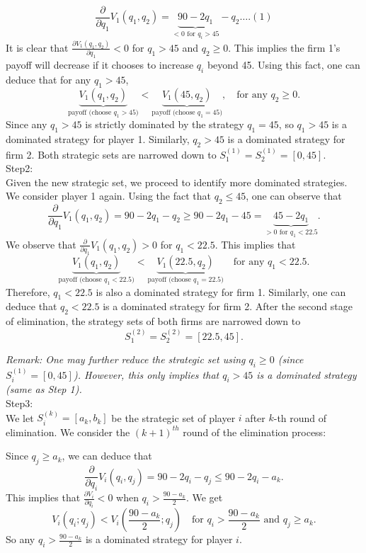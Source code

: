 \documentclass[twoside]{article}
\theoremstyle{definitionstyle}
\begin{document}
\[
\frac{\partial}{\partial q_1} V_1(q_1, q_2) = \underbrace{90 - 2q_1}_{\text{$<0$ for $q_i>45$}}-q_2\dots.(1)
\]
It is clear that $\frac{\partial V_1(q_1,q_2)}{\partial q_1} < 0$ for $q_1 > 45$ and $q_2 \geq 0$. This implies the firm 1's payoff will decrease if it chooses to increase $q_i$ beyond 45. Using this fact, one can deduce that for any $q_1 > 45$,
\[
\underbrace{V_1(q_1, q_2)}_{\text{payoff (choose } q_1 > 45)} < \underbrace{V_1(45, q_2)}_{\text{payoff (choose } q_1 = 45)}, \quad \text{for any } q_2 \geq 0.
\]
Since any $q_1 > 45$ is strictly dominated by the strategy $q_1 = 45$, so $q_1 > 45$ is a dominated strategy for player 1. Similarly, $q_2 > 45$ is a dominated strategy for firm 2.
Both strategic sets are narrowed down to $S_1^{(1)} = S_2^{(1)} = [0,45]$.\\

Step2: \\
Given the new strategic set, we proceed to identify more dominated strategies. We consider player 1 again. Using the fact that $q_2 \leq 45$, one can observe that
\[
\frac{\partial}{\partial q_1} V_1(q_1, q_2) = 90 - 2q_1 - q_2 \geq 90 - 2q_1 - 45 = \underbrace{45 - 2q_1}_{\text{$>0$ for $q_1 < 22.5$}}.
\]
We observe that $\frac{\partial}{\partial q_1} V_1(q_1, q_2) > 0$ for $q_1 < 22.5$. This implies that
\[
\underbrace{V_1(q_1, q_2)}_{\text{payoff (choose } q_1 < 22.5)} < \underbrace{V_1(22.5, q_2)}_{\text{payoff (choose } q_1 = 22.5)} \quad \text{for any } q_1 < 22.5.
\]
Therefore, $q_1 < 22.5$ is also a dominated strategy for firm 1. Similarly, one can deduce that $q_2 < 22.5$ is a dominated strategy for firm 2. After the second stage of elimination, the strategy sets of both firms are narrowed down to
\[
S_1^{(2)} = S_2^{(2)} = [22.5,45].
\]

\textit{Remark: One may further reduce the strategic set using $q_i \geq 0$ (since $S_i^{(1)} = [0, 45]$). However, this only implies that $q_i > 45$ is a dominated strategy (same as Step 1).}\\
Step3: \\
We let $S_i^{(k)} = [a_k, b_k]$ be the strategic set of player $i$ after $k$-th round of elimination. We consider the $(k+1)^{th}$ round of the elimination process:

Since $q_j \geq a_k$, we can deduce that
\[
\frac{\partial}{\partial q_i} V_i(q_i, q_j) = 90 - 2q_i - q_j \leq 90 - 2q_i - a_k.
\]
This implies that $\frac{\partial V_i}{\partial q_i} < 0$ when $q_i > \frac{90-a_k}{2}$. We get
\[
V_i(q_i; q_j) < V_i\left(\frac{90 - a_k}{2}; q_j\right) \quad \text{for } q_i > \frac{90 - a_k}{2} \text{ and } q_j \geq a_k.
\]
So any $q_i > \frac{90-a_k}{2}$ is a dominated strategy for player $i$.
\end{document}
